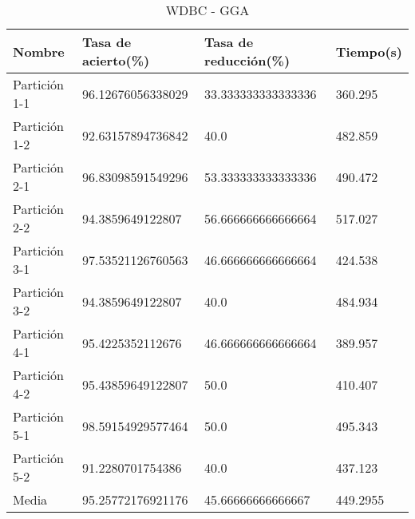 \begin{table}[H]
	\centering
	\begin{tabular}{l|lll}
		Nombre        & Tasa de acierto(\%) & Tasa de reducción(\%) & Tiempo(s)          \\ \hline
		Partición 1-1 & 96.12676056338029   & 33.333333333333336    & 360.295   \\
		Partición 1-2 & 92.63157894736842   & 40.0                  & 482.859   \\
		Partición 2-1 & 96.83098591549296   & 53.333333333333336    & 490.472   \\
		Partición 2-2 & 94.3859649122807    & 56.666666666666664    & 517.027   \\
		Partición 3-1 & 97.53521126760563   & 46.666666666666664    & 424.538   \\
		Partición 3-2 & 94.3859649122807    & 40.0                  & 484.934   \\
		Partición 4-1 & 95.4225352112676    & 46.666666666666664    & 389.957   \\
		Partición 4-2 & 95.43859649122807   & 50.0                  & 410.407   \\
		Partición 5-1 & 98.59154929577464   & 50.0                  & 495.343   \\
		Partición 5-2 & 91.2280701754386    & 40.0                  & 437.123   \\ \hline
		Media         & 95.25772176921176   & 45.66666666666667     & 449.2955 
	\end{tabular}
	\caption{WDBC - GGA}
	\label{WDBC-GGA}
\end{table}